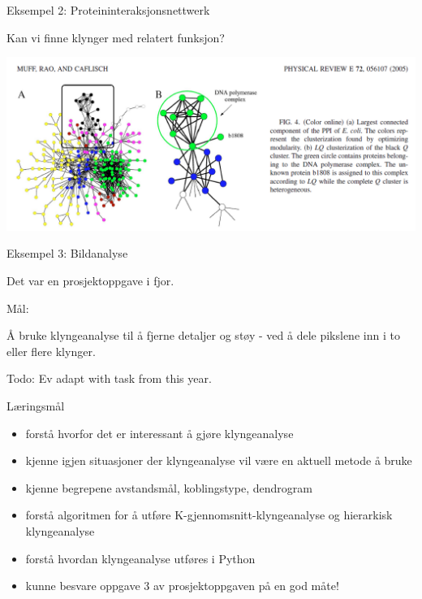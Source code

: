 \documentclass[10pt,ignorenonframetext,]{beamer}
\begin{document}
\begin{frame}{Eksempel 2: Proteininteraksjonsnettwerk}
\protect\hypertarget{eksempel-2-proteininteraksjonsnettwerk}{}

Kan vi finne klynger med relatert funksjon?

\includegraphics{muff_etal.png}

\end{frame}

\begin{frame}{Eksempel 3: Bildanalyse}
\protect\hypertarget{eksempel-3-bildanalyse}{}

Det var en prosjektoppgave i fjor.

Mål:

Å bruke klyngeanalyse til å fjerne detaljer og støy - ved å dele
pikslene inn i to eller flere klynger.

Todo: Ev adapt with task from this year.

\end{frame}

\begin{frame}{Læringsmål}
\protect\hypertarget{luxe6ringsmuxe5l}{}

\begin{itemize}
\item
  forstå hvorfor det er interessant å gjøre klyngeanalyse
\item
  kjenne igjen situasjoner der klyngeanalyse vil være en aktuell metode
  å bruke
\item
  kjenne begrepene avstandsmål, koblingstype, dendrogram
\item
  forstå algoritmen for å utføre K-gjennomsnitt-klyngeanalyse og
  hierarkisk klyngeanalyse
\item
  forstå hvordan klyngeanalyse utføres i Python
\item
  kunne besvare oppgave 3 av prosjektoppgaven på en god måte!
\end{itemize}

\end{frame}
\end{document}
